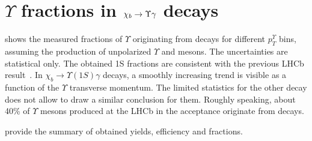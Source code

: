 \section[\texorpdfstring{$\Upsilon$ fractions}{Y fractions}]{\texorpdfstring{$\Upsilon$}{Y} fractions in \texorpdfstring{$\chi_{{b}} \rightarrow \Upsilon \gamma$}{chib --> Y gamma} decays}
\label{sec:fraction}

 shows the measured fractions of $\Upsilon$  originating
from \chib decays for different $p_T^{\Upsilon}$ bins,  assuming the production
of unpolarized $\Upsilon$ and \chib mesons. The uncertainties are statistical
only. The obtained \Y1S fractions are consistent with the previous LHCb
result~\cite{LHCb-PAPER-2012-015}. In $\chi_b \rightarrow \Upsilon(1S) \gamma$
decays, a smoothly increasing trend is visible as a function of the $\Upsilon$
transverse momentum. The limited statistics for the other decay does not allow
to draw a similar conclusion for them. Roughly speaking, about 40\% of $\Upsilon$ mesons 
produced at the LHCb in the \lhcb acceptance originate from \chib decays. 




 provide the summary
of obtained yields, efficiency and fractions.


